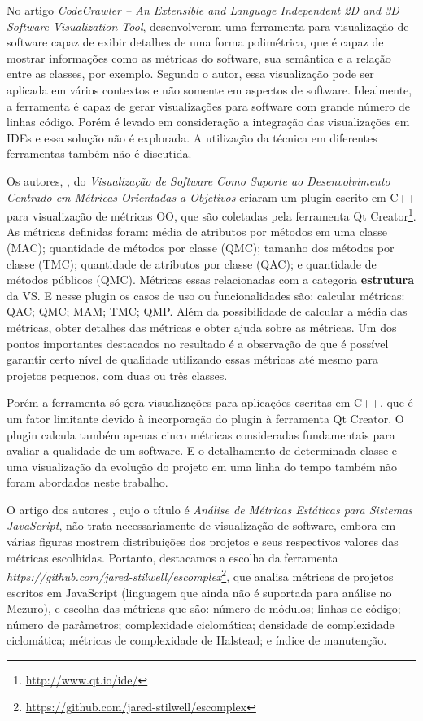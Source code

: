 
No artigo \textit{CodeCrawler – An Extensible and Language Independent 2D and
3D Software Visualization Tool}, 
desenvolveram uma ferramenta para visualização de software capaz de exibir
detalhes de uma forma polimétrica, que é capaz de mostrar informações como as
métricas do software, sua semântica e a relação entre as classes, por exemplo.
Segundo o autor, essa visualização pode ser aplicada em vários contextos e não
somente em aspectos de software. Idealmente, a ferramenta é capaz de gerar
visualizações para software com grande número de linhas código. Porém é levado
em consideração a integração das visualizações em IDEs e essa solução não é
explorada. A utilização da técnica em diferentes ferramentas também não é
discutida.

Os autores, , do \textit{Visualização de Software
Como Suporte ao Desenvolvimento Centrado em Métricas Orientadas a Objetivos}
criaram um plugin escrito em C++ para visualização de métricas OO, que são
coletadas pela ferramenta Qt Creator\footnote{\url{http://www.qt.io/ide/}}. As
métricas definidas foram: média de atributos por métodos em uma classe (MAC);
quantidade de métodos por classe (QMC); tamanho dos métodos por classe (TMC);
quantidade de atributos por classe (QAC); e quantidade de métodos públicos
(QMC). Métricas essas relacionadas com a categoria \textbf{estrutura} da VS.
E nesse plugin os casos de uso ou funcionalidades
são: calcular métricas: QAC; QMC; MAM; TMC; QMP. Além da
possibilidade de calcular a média das métricas, obter detalhes das métricas e
obter ajuda sobre as métricas. Um dos pontos importantes destacados no
resultado é a observação de que é possível garantir certo nível de qualidade
utilizando essas métricas até mesmo para projetos pequenos, com duas ou três
classes.

Porém a ferramenta só gera visualizações para aplicações escritas em C++, que é
um fator limitante devido à incorporação do plugin à ferramenta Qt Creator. O
plugin calcula também apenas cinco métricas consideradas fundamentais para
avaliar a qualidade de um software. E o detalhamento de determinada classe e
uma visualização da evolução do projeto em uma linha do tempo também não foram
abordados neste trabalho.

O artigo dos autores , cujo o título é \textit{Análise de
Métricas Estáticas para Sistemas JavaScript}, não trata necessariamente de
visualização de software, embora em várias figuras mostrem distribuições dos
projetos e seus respectivos valores das métricas escolhidas. Portanto,
destacamos a escolha da ferramenta
\textit{https://github.com/jared-stilwell/escomplex}\footnote{\url{https://github.com/jared-stilwell/escomplex}},
que analisa métricas de projetos escritos em JavaScript (linguagem que ainda
não é suportada para análise no Mezuro), e escolha das métricas que são: número
de módulos; linhas de código; número de parâmetros; complexidade ciclomática;
densidade de complexidade ciclomática; métricas de complexidade de Halstead; e
índice de manutenção.


